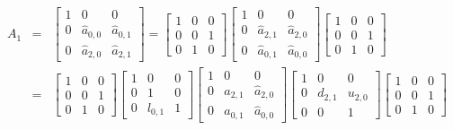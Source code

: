 \begin{eqnarray*}
A_1 & = & 
\left \lbrack \begin{array}{ccc}
1 & 0 & 0 \\
0 & {\hat a}_{0,0} & {\hat a}_{0,1} \\
0 & {\hat a}_{2,0} & {\hat a}_{2,1}
\end{array} \right \rbrack
 =
\left \lbrack \begin{array}{ccc}
1 & 0 & 0 \\
0 & 0 & 1 \\
0 & 1 & 0
\end{array} \right \rbrack
\left \lbrack \begin{array}{ccc}
1 & 0 & 0 \\
0 & {\hat a}_{2,1} & {\hat a}_{2,0} \\
0 & {\hat a}_{0,1} & {\hat a}_{0,0}
\end{array} \right \rbrack
\left \lbrack \begin{array}{ccc}
1 & 0 & 0 \\
0 & 0 & 1 \\
0 & 1 & 0
\end{array} \right \rbrack \\
& = &
\left \lbrack \begin{array}{ccc}
1 & 0 & 0 \\
0 & 0 & 1 \\
0 & 1 & 0
\end{array} \right \rbrack
\left \lbrack \begin{array}{ccc}
1 & 0 & 0 \\
0 & 1 & 0 \\
0 & l_{0,1} & 1
\end{array} \right \rbrack
\left \lbrack \begin{array}{ccc}
1 & 0 & 0 \\
0 & {\hat a}_{2,1} & {\hat a}_{2,0} \\
0 & {\hat a}_{0,1} & {\hat a}_{0,0}
\end{array} \right \rbrack
\left \lbrack \begin{array}{ccc}
1 & 0 & 0 \\
0 & d_{2,1} & u_{2,0} \\
0 & 0 & 1
\end{array} \right \rbrack
\left \lbrack \begin{array}{ccc}
1 & 0 & 0 \\
0 & 0 & 1 \\
0 & 1 & 0
\end{array} \right \rbrack \\

\end{eqnarray*}

